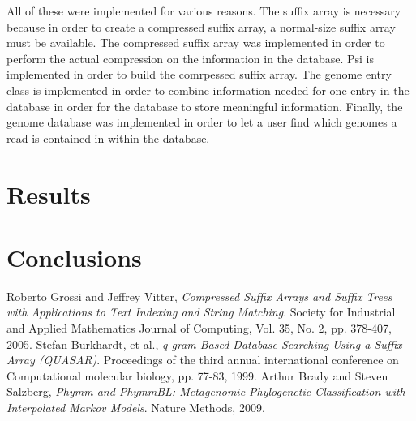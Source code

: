 \documentclass{article}
\begin{document}
\indent All of these were implemented for various reasons. The suffix array is necessary because in order to create a compressed suffix array, a normal-size suffix array must be available. The compressed suffix array was implemented in order to perform the actual compression on the information in the database. Psi is implemented in order to build the comrpessed suffix array. The genome entry class is implemented in order to combine information needed for one entry in the database in order for the database to store meaningful information. Finally, the genome database was implemented in order to let a user find which genomes a read is contained in within the database.\\
\section{Results}

\section{Conclusions}
\begin{thebibliography}{1}
	Roberto Grossi and Jeffrey Vitter,
	\emph{Compressed Suffix Arrays and Suffix Trees with Applications to Text Indexing and String Matching}.
	Society for Industrial and Applied Mathematics Journal of Computing,
	Vol. 35, No. 2, pp. 378-407,
	2005.
	Stefan Burkhardt, et al.,
	\emph{q-gram Based Database Searching Using a Suffix Array (QUASAR)}.
	Proceedings of the third annual international conference on Computational molecular biology,
	pp. 77-83,
	1999.
	Arthur Brady and Steven Salzberg,
	\emph{Phymm and PhymmBL: Metagenomic Phylogenetic Classification with Interpolated Markov Models}.
	Nature Methods,
	2009.
\end{thebibliography}
\end{document}
